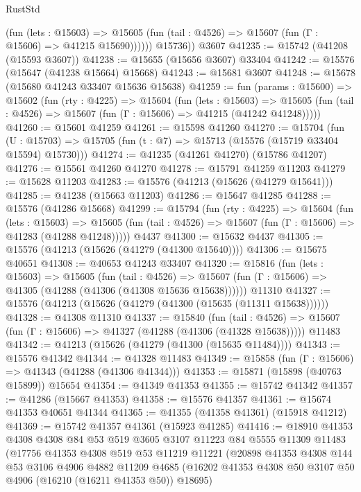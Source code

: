 \begin{lexlean}{RustStd}
\begin{coremodule}
              (fun (lets : @15603) =>
              @15605 (fun (tail : @4526) => @15607 (fun (Γ : @15606) => @41215 @15690))))))
        @15736))
    @3607
@41235 := @15742 (@41208 (@15593 @3607))
@41238 := @15655 (@15656 @3607) @33404
@41242 := @15576 (@15647 (@41238 @15664) @15668)
@41243 := @15681 @3607
@41248 := @15678 (@15680 @41243 @33407 @15636 @15638)
@41259 := fun (params : @15600) =>
  @15602
    (fun (rty : @4225) =>
    @15604
      (fun (lets : @15603) =>
      @15605 (fun (tail : @4526) => @15607 (fun (Γ : @15606) => @41215 (@41242 @41248)))))
@41260 := @15601 @41259
@41261 := @15598 @41260
@41270 := @15704
    (fun (U : @15703) => @15705 (fun (t : @7) => @15713 (@15576 (@15719 @33404 @15594) @15730)))
@41274 := @41235 (@41261 @41270) (@15786 @41207)
@41276 := @15561 @41260 @41270
@41278 := @15791 @41259 @11203
@41279 := @15628 @11203
@41283 := @15576 (@41213 (@15626 (@41279 @15641)))
@41285 := @41238 (@15663 @11203)
@41286 := @15647 @41285
@41288 := @15576 (@41286 @15668)
@41299 := @15794
    (fun (rty : @4225) =>
    @15604
      (fun (lets : @15603) =>
      @15605 (fun (tail : @4526) => @15607 (fun (Γ : @15606) => @41283 (@41288 @41248)))))
    @4437
@41300 := @15632 @4437
@41305 := @15576 (@41213 (@15626 (@41279 (@41300 @15640))))
@41306 := @15675 @40651
@41308 := @40653 @41243 @33407
@41320 := @15816
    (fun (lets : @15603) =>
    @15605
      (fun (tail : @4526) =>
      @15607 (fun (Γ : @15606) => @41305 (@41288 (@41306 (@41308 @15636 @15638))))))
    @11310
@41327 := @15576 (@41213 (@15626 (@41279 (@41300 (@15635 (@11311 @15638))))))
@41328 := @41308 @11310
@41337 := @15840
    (fun (tail : @4526) => @15607 (fun (Γ : @15606) => @41327 (@41288 (@41306 (@41328 @15638)))))
    @11483
@41342 := @41213 (@15626 (@41279 (@41300 (@15635 @11484))))
@41343 := @15576 @41342
@41344 := @41328 @11483
@41349 := @15858 (fun (Γ : @15606) => @41343 (@41288 (@41306 @41344)))
@41353 := @15871 (@15898 (@40763 @15899)) @15654
@41354 := @41349 @41353
@41355 := @15742 @41342
@41357 := @41286 (@15667 @41353)
@41358 := @15576 @41357
@41361 := @15674 @41353 @40651 @41344
@41365 := @41355 (@41358 @41361) (@15918 @41212)
@41369 := @15742 @41357 @41361 (@15923 @41285)
@41416 := @18910
    @41353
    @4308
    @4308
    @84
    @53
    @519
    @3605
    @3107
    @11223
    @84
    @5555
    @11309
    @11483
    (@17756
      @41353
      @4308
      @519
      @53
      @11219
      @11221
      (@20898
        @41353
        @4308
        @144
        @53
        @3106
        @4906
        @4882
        @11209
        @4685
        (@16202 @41353 @4308 @50 @3107 @50 @4906 (@16210 (@16211 @41353 @50)) @18695)

\end{coremodule}
\end{lexlean}
